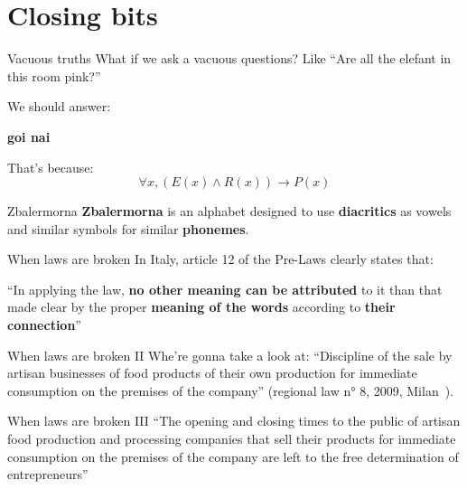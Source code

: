 \section{Closing bits}
\begin{frame}{Vacuous truths}
    What if we ask a vacuous questions? Like ``Are all the elefant in this room pink?''

    \pause
    We should answer:
    \begin{center}
        \textbf{go\textquotesingle i na\textquotesingle i}
    \end{center}

    \pause
    That's because:
    \[
        \forall x, (E(x) \wedge R(x)) \rightarrow P(x)
    \]
\end{frame}

\begin{frame}{Zbalermorna}
    \textbf{Zbalermorna} is an alphabet designed to use \textbf{diacritics} as vowels and similar symbols for similar \textbf{phonemes}.
\end{frame}

\begin{frame}{When laws are broken}
    In Italy, article 12 of the Pre-Laws clearly states that:
    \begin{center}
        \large
        ``In applying the law, \textbf{no other meaning can be attributed} to it than that made clear by the proper \textbf{meaning of the words} according to \textbf{their connection}''
    \end{center}
\end{frame}

\begin{frame}{When laws are broken II}
    Whe're gonna take a look at: ``Discipline of the sale by artisan businesses of food products of their own production for immediate consumption on the premises of the company'' (regional law n° 8, 2009, Milan~\cite{lojban:ambiguity}).
\end{frame}

\begin{frame}{When laws are broken III}
    \large
    ``The opening and closing times to the public of artisan food production and processing companies that sell their products for immediate consumption on the premises of the company are left to the free determination of entrepreneurs''
\end{frame}
